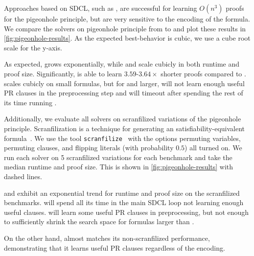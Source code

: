 Approaches based on SDCL, such as \sadical, are successful for learning $O(n^3)$
proofs for the pigeonhole principle, but are very sensitive to the encoding of
the formula. We compare the solvers on pigeonhole principle from  to
 and plot these results in \autoref{fig:pigeonhole-results}. As the
expected best-behavior is cubic, we use a cube root scale for the y-axis.

As expected, \cadical grows exponentially, while \sadical and \tool scale
cubicly in both runtime and proof size. Significantly, \tool is able to learn
$3.59$-$3.64\times$ shorter proofs compared to \sadical. 
\prelearn scales cubicly on small formulas, but for  and larger, will not
learn enough useful PR clauses in the preprocessing step and will timeout after
spending the rest of its time running \cadical.


Additionally, we evaluate all solvers on scranfilized variations of the
pigeonhole principle. Scranfilization is a technique for generating an
satisfiability-equivalent formula~\cite{scranfilize}. We use the tool
\texttt{scranfilize}~\cite{scranfilize} with the options permuting variables,
permuting clauses, and flipping literals (with probability $0.5$) all turned on.
We run each solver on 5 scranfilized variations for each benchmark and take the
median runtime and proof size. This is shown in \autoref{fig:pigeonhole-results}
with dashed lines.

\sadical and \prelearn exhibit an exponential trend for runtime and proof size
on the scranfilized benchmarks. \sadical will spend all its time in the main
SDCL loop not learning enough useful clauses. \prelearn will learn some useful
PR clauses in preprocessing, but not enough to sufficiently shrink the search
space for formulas larger than .

On the other hand, \tool almost matches its non-scranfilized performance,
demonstrating that it learns useful PR clauses regardless of the encoding.




